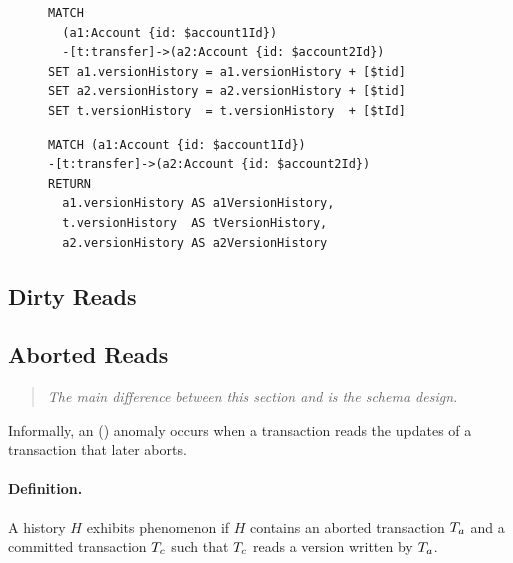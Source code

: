 \begin{figure}[htb]
  \centering
  \begin{minipage}{0.53\linewidth}
\begin{lstlisting}[language=cypher,label=fig:dw1,caption=\tx{Dirty Write (G0) $T_\mathrm{W}$}.]
MATCH
  (a1:Account {id: $account1Id})
  -[t:transfer]->(a2:Account {id: $account2Id})
SET a1.versionHistory = a1.versionHistory + [$tid]
SET a2.versionHistory = a2.versionHistory + [$tid]
SET t.versionHistory  = t.versionHistory  + [$tId]
\end{lstlisting}
\end{minipage}
\quad
\begin{minipage}{0.431\linewidth}
\begin{lstlisting}[language=cypher,label=fig:dw2,caption=\tx{Dirty Write (G0) $T_\mathrm{R}$}.]
MATCH (a1:Account {id: $account1Id})
-[t:transfer]->(a2:Account {id: $account2Id})
RETURN
  a1.versionHistory AS a1VersionHistory,
  t.versionHistory  AS tVersionHistory,
  a2.versionHistory AS a2VersionHistory
\end{lstlisting}
\end{minipage}
\end{figure}

\subsection{Dirty Reads}
\label{sec:dirty-reads-1}

\subsection*{Aborted Reads}

\begin{quote}
  \textit{The main difference between this section and \ldbcsnb\xspace
          is the schema design.
  }
\end{quote}

Informally, an  () anomaly occurs when a 
transaction reads the updates of a transaction that later aborts.

\paragraph{Definition.}
A history $H$ exhibits phenomenon  if $H$ contains an aborted 
transaction $T_a$ and a committed transaction $T_c$ such that 
$T_c$ reads a version written by $T_a$.

